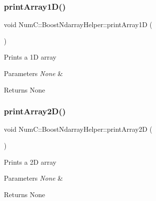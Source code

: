 \subsubsection{\texorpdfstring{print\+Array1\+D()}{printArray1D()}}
{\footnotesize\ttfamily void Num\+C\+::\+Boost\+Ndarray\+Helper\+::print\+Array1D (\begin{DoxyParamCaption}{ }\end{DoxyParamCaption})\hspace{0.3cm}{\ttfamily [inline]}}

Prints a 1D array


\begin{DoxyParams}{Parameters}
{\em None} & \\
\hline
\end{DoxyParams}
\begin{DoxyReturn}{Returns}
None 
\end{DoxyReturn}
\mbox{\label{class_num_c_1_1_boost_ndarray_helper_a190d7e62ef5bd8bcf6212ebda2b22869}} 
\subsubsection{\texorpdfstring{print\+Array2\+D()}{printArray2D()}}
{\footnotesize\ttfamily void Num\+C\+::\+Boost\+Ndarray\+Helper\+::print\+Array2D (\begin{DoxyParamCaption}{ }\end{DoxyParamCaption})\hspace{0.3cm}{\ttfamily [inline]}}

Prints a 2D array


\begin{DoxyParams}{Parameters}
{\em None} & \\
\hline
\end{DoxyParams}
\begin{DoxyReturn}{Returns}
None 
\end{DoxyReturn}
\mbox{\label{class_num_c_1_1_boost_ndarray_helper_aacac04deba2f5405ab9188b2818853f9}} 
